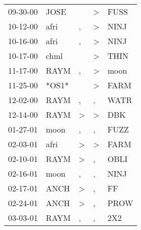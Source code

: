 \begin{supertabular}{p{0.07\textwidth}p{0.06\textwidth}p{0.02\textwidth}p{0.02\textwidth}p{0.06\textwidth}}
 09-30-00\textsuperscript{} &           JOSE\textsuperscript{} &                  &     \textgreater &           FUSS\textsuperscript{} \\
 10-12-00\textsuperscript{} &           afri\textsuperscript{} &                , &     \textgreater &           NINJ\textsuperscript{} \\
 10-16-00\textsuperscript{} &           afri\textsuperscript{} &                , &     \textgreater &           NINJ\textsuperscript{} \\
 10-17-00\textsuperscript{} &           chml\textsuperscript{} &                  &     \textgreater &           THIN\textsuperscript{} \\
 11-17-00\textsuperscript{} &           RAYM\textsuperscript{} &                , &     \textgreater &           moon\textsuperscript{} \\
 11-25-00\textsuperscript{} &                            *OS1* &                  &     \textgreater &           FARM\textsuperscript{} \\
 12-02-00\textsuperscript{} &           RAYM\textsuperscript{} &                , &                , &           WATR\textsuperscript{} \\
 12-14-00\textsuperscript{} &           RAYM\textsuperscript{} &     \textgreater &     \textgreater &            DBK\textsuperscript{} \\
 01-27-01\textsuperscript{} &           moon\textsuperscript{} &                , &                , &           FUZZ\textsuperscript{} \\
 02-03-01\textsuperscript{} &           afri\textsuperscript{} &     \textgreater &     \textgreater &           FARM\textsuperscript{} \\
 02-10-01\textsuperscript{} &           RAYM\textsuperscript{} &     \textgreater &                , &           OBLI\textsuperscript{} \\
 02-16-01\textsuperscript{} &           moon\textsuperscript{} &                , &                , &           NINJ\textsuperscript{} \\
 02-17-01\textsuperscript{} &           ANCH\textsuperscript{} &     \textgreater &                , &             FF\textsuperscript{} \\
 02-24-01\textsuperscript{} &           ANCH\textsuperscript{} &     \textgreater &                , &           PROW\textsuperscript{} \\
 03-03-01\textsuperscript{} &           RAYM\textsuperscript{} &                , &                , &            2X2\textsuperscript{} \\

\end{supertabular}
